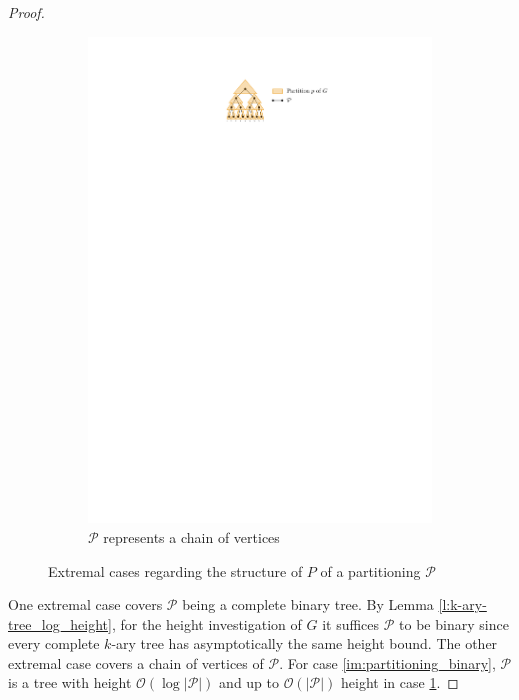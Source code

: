 \begin{proof}
\begin{figure}[H]
\begin{subfigure}{0.6\textwidth}
			\includegraphics[page=2,width=\linewidth]{graphics/Partitioning_scheme.pdf}
			\caption{$\mathcal{P}$ represents a chain of vertices}\label{im:partitioning_chain}
		\end{subfigure}
		\caption{Extremal cases regarding the structure of $P$ of a partitioning $\mathcal{P}$}\label{im:partitioning_scheme}
	\end{figure}
	One extremal case covers $\mathcal{P}$ being a complete binary tree. By Lemma \ref{l:k-ary-tree_log_height}, for the height investigation of $G$ it suffices $\mathcal{P}$ to be binary since every complete $k$-ary tree has asymptotically the same height bound. The other extremal case covers a chain of vertices of $\mathcal{P}$. For case \ref{im:partitioning_binary}, $\mathcal{P}$ is a tree with height $\mathcal{O}(\log |\mathcal{P}|)$ and up to $\mathcal{O}(|\mathcal{P}|)$ height in case \ref{im:partitioning_chain}.

\end{proof}
